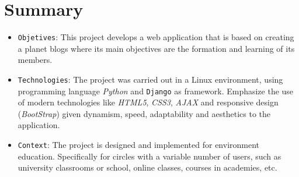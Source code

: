 \documentclass[a4paper, 12pt]{book}
\begin{document}

\chapter*{Summary}
\begin{itemize}
  \item \texttt{Objetives}: This project develops a web application that is based on creating a planet blogs where its main objectives are the formation and learning
  of its members.
  
  \item \texttt{Technologies}: The project was carried out in a Linux environment, using programming language \textit{Python} and \texttt{Django} as framework. Emphasize the use of modern 
  technologies like \textit{HTML5}, \textit{CSS3}, \textit{AJAX} and responsive design (\textit{BootStrap}) given dynamism, speed, adaptability and aesthetics to the application.

  \item \texttt{Context}: The project is designed and implemented for environment education. Specifically for circles with a variable number of users, such as university 
  classrooms or school, online classes, courses in academies, etc.
\end{itemize}




\tableofcontents 
\cleardoublepage
{}
{} %
\listoffigures %


\end{document}
